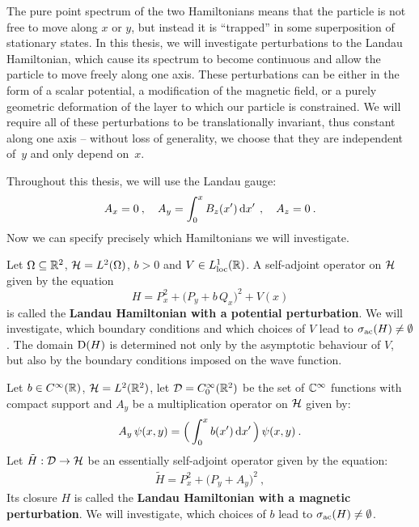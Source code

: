 The pure point spectrum of the two Hamiltonians means that the particle is not free to move along $x$ or $y$, but instead it is “trapped” in some superposition of stationary states. In this thesis, we will investigate perturbations to the Landau Hamiltonian, which cause its spectrum to become continuous and allow the particle to move freely along one axis. These perturbations can be either in the form of a scalar potential, a modification of the magnetic field, or a purely geometric deformation of the layer to which our particle is constrained. We will require all of these perturbations to be translationally invariant, thus constant along one axis – without loss of generality, we choose that they are independent of~$y$ and only depend on~$x$.

Throughout this thesis, we will use the Landau gauge:
\begin{align*}
    A_x = 0 \: , \quad
    A_y = \int_0^x B_z(x') \, \mathrm{d}x' \, \: , \quad
    A_z = 0 \: .
\end{align*}
Now we can specify precisely which Hamiltonians we will investigate.

\begin{defn}
    \label{defn-perturb-potential}
    Let $\Omega \subseteq \mathbb{R}^2$, $\mathcal{H} = L^2(\Omega)$, $b>0$ and $V \in L^1_{\text{loc}}(\mathbb{R})$. A self-adjoint operator on $\mathcal{H}$ given by the equation
    \begin{equation*}
        H
        = P^2_x
        + \big( P_y + b \, Q_x \big)^2
        + V(x)
    \end{equation*}
    is called the \textbf{Landau Hamiltonian with a potential perturbation}. We will investigate, which boundary conditions and which choices of $V$ lead to $\sigma_{\mathrm{ac}}(H) \neq \emptyset$. The domain $\mathrm{D}(H)$ is determined not only by the asymptotic behaviour of $V$, but also by the boundary conditions imposed on the wave function.
\end{defn}

\begin{defn}
    \label{defn-perturb-magnet}
    Let $b \in C^\infty(\mathbb{R})$, $\mathcal{H} = L^2(\mathbb{R}^2)$, let $\mathcal{D} = C^\infty_0(\mathbb{R}^2)$ be the set of $\mathbb{C}^\infty$ functions with compact support and $A_y$ be a multiplication operator on $\mathcal{H}$ given by:
    \begin{align*}
        A_y \, \psi(x, y) = \Big( \int_0^x b(x') \, \mathrm{d}x' \, \Big) \, \psi(x, y) \: .
    \end{align*}
    Let $\tilde H: \mathcal{D} \to \mathcal{H}$ be an essentially self-adjoint operator given by the equation:
    \begin{align*}
        \tilde H = P^2_x + \big( P_y + A_y \big)^2 \: ,
    \end{align*}
    Its closure $H$ is called the \textbf{Landau Hamiltonian with a magnetic perturbation}. We will investigate, which choices of $b$ lead to $\sigma_{\mathrm{ac}}(H) \neq \emptyset$.
\end{defn}

